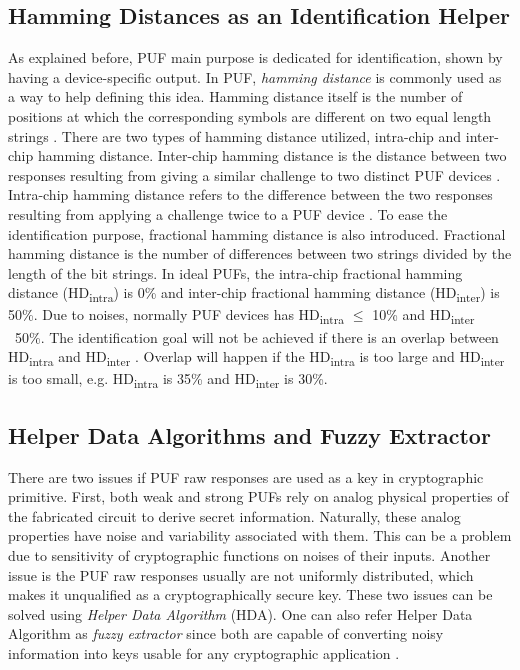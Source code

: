 \subsection{Hamming Distances as an Identification Helper}

As explained before, PUF main purpose is dedicated for identification, shown by having a device-specific output. In PUF, \textit{hamming distance} is commonly used as a way to help defining this idea. Hamming distance itself is the number of positions at which the corresponding symbols are different on two equal length strings \cite{hamming_distance}.
There are two types of hamming distance utilized, intra-chip and inter-chip hamming distance. Inter-chip hamming distance is the distance between two responses resulting from giving a similar challenge to two distinct PUF devices \cite{study_of_the_art_puf}. Intra-chip hamming distance refers to the difference between the two responses resulting from applying a challenge twice to a PUF device \cite{modeling_sram}. To ease the identification purpose, fractional hamming distance is also introduced. Fractional hamming distance is the number of differences between two strings divided by the length of the bit strings.
In ideal PUFs, the intra-chip fractional hamming distance (HD\textsubscript{intra}) is 0\% and inter-chip fractional hamming distance (HD\textsubscript{inter}) is 50\%. Due to noises, normally PUF devices has HD\textsubscript{intra} $\leq$ 10\% and HD\textsubscript{inter} ~50\%. The identification goal will not be achieved if there is an overlap between HD\textsubscript{intra} and HD\textsubscript{inter} \cite{impact_aging}. Overlap will happen if the HD\textsubscript{intra} is too large and HD\textsubscript{inter} is too small, e.g. HD\textsubscript{intra} is 35\% and HD\textsubscript{inter} is 30\%.

\subsection{Helper Data Algorithms and Fuzzy Extractor}

There are two issues if PUF raw responses are used as a key in cryptographic primitive. First, both weak and strong PUFs rely on analog physical properties of the fabricated circuit to derive secret information. Naturally, these analog properties have noise and variability associated with them.
This can be a problem due to sensitivity of cryptographic functions on noises of their inputs.
Another issue is the PUF raw responses usually are not uniformly distributed, which makes it unqualified as a cryptographically secure key. These two issues can be solved using \textit{Helper Data Algorithm} (HDA). One can also refer Helper Data Algorithm as \textit{fuzzy extractor} since both are capable of converting noisy information into keys usable for any cryptographic application \cite{efficient_helper} \cite{fuzzy_extractor}.

